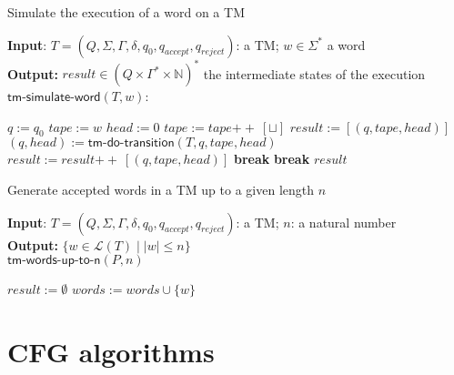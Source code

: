 \documentclass[11pt]{article}
\newcommand*{\Language}[1]{\ensuremath{\mathcal{L}(#1)}}
\newcommand{\concat}{\ensuremath{+\!\!+\:}}
\newcommand{\blank}{\ensuremath{\sqcup}}
\begin{document}
\begin{algorithm}
\small
\caption{Simulate the execution of a word on a TM }
\vspace*{1ex}
{\textbf{Input}:} 
$T = (Q, \Sigma, \Gamma, \delta, q_0, q_{accept}, q_{reject})$: a TM; $w \in \Sigma^*$ a word \\
\textbf{Output:}
$result \in (Q \times \Gamma^* \times \mathbb{N})^*$ the intermediate states of the execution \\

$\textsf{tm-simulate-word}(T, w)$:
\begin{algorithmic}[1]
\State $q := q_0$
\State $tape := w$
\State $head := 0$
  \State $tape := tape \concat [ \blank ]$ 
\EndIf
\State $result := [(q, tape, head)]$
  \State $(q, head) := \textsf{tm-do-transition}(T, q, tape, head)$
  \State $result := result \concat [(q, tape, head)]$
    \State \textbf{break}
  \EndIf
    \State \textbf{break}
  \EndIf
\EndWhile
\State \Return $result$
\end{algorithmic}
\end{algorithm}


\begin{algorithm}
\small
\caption{Generate accepted words in a TM up to a given length $n$}
\vspace*{1ex}
{\textbf{Input}:} 
$T = (Q, \Sigma, \Gamma, \delta, q_0, q_{accept}, q_{reject})$: a TM; $n$: a natural number \\
\textbf{Output:}
$ \{ w \in \Language{T} \mid |w| \leq n \} $ \\

$\textsf{tm-words-up-to-n}(P, n)$
\begin{algorithmic}[1]
\State $result := \emptyset$
        \State $words := words \cup \{ w \}$
      \EndIf
    \EndFor
\EndFor
\end{algorithmic}
\end{algorithm}

\clearpage

\section{CFG algorithms}
\end{document}
